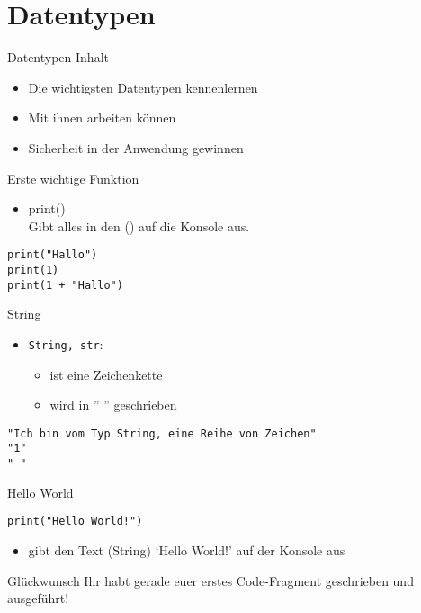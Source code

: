 \section{Datentypen}

\begin{frame}[fragile]{Datentypen}
Inhalt
\begin{itemize}
	\item Die wichtigsten Datentypen kennenlernen
	\item Mit ihnen arbeiten können
	\item Sicherheit in der Anwendung gewinnen
\end{itemize}
\end{frame}

\begin{frame}[fragile]{Erste wichtige Funktion}
\begin{itemize}
	\item print()\\
	Gibt alles in den () auf die Konsole aus.
\end{itemize}
\begin{lstlisting}
print("Hallo")
print(1)
print(1 + "Hallo")
\end{lstlisting}
\end{frame}



\begin{frame}[fragile]{String}
\begin{itemize}
    \item \texttt{String, str}: 
     	\begin{itemize}
     		\item ist eine Zeichenkette
     		\item wird in '' '' geschrieben
     	\end{itemize}
     \end{itemize}
    \begin{lstlisting}
"Ich bin vom Typ String, eine Reihe von Zeichen"
"1"
" "
    \end{lstlisting}
\end{frame}

\begin{frame}[fragile]{Hello World}
\begin{lstlisting}
print("Hello World!")
\end{lstlisting}
\begin{itemize}
	\item gibt den Text (String) `Hello World!' auf der Konsole aus
\end{itemize}
\begin{exampleblock}{Glückwunsch}
	Ihr habt gerade euer erstes Code-Fragment geschrieben und ausgeführt!
\end{exampleblock}
\end{frame}


